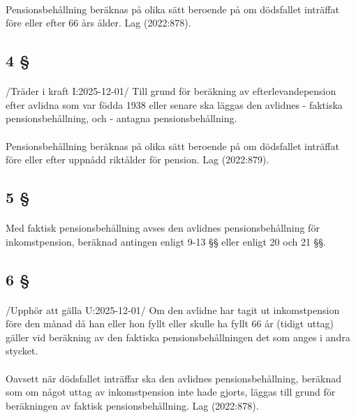 \documentclass[a4paper,notitlepage,openany,10pt]{book}
\begin{document}
\paragraph*{}
Pensionsbehållning beräknas på olika sätt beroende på om dödsfallet inträffat före eller efter 66 års ålder.
Lag (2022:878).
\subsection*{4 §}
\paragraph*{}
/Träder i kraft I:2025-12-01/
Till grund för beräkning av efterlevandepension efter avlidna som var födda 1938 eller senare ska läggas den avlidnes
\newline - faktiska pensionsbehållning, och
\newline - antagna pensionsbehållning.
\paragraph*{}
Pensionsbehållning beräknas på olika sätt beroende på om dödsfallet inträffat före eller efter uppnådd riktålder för pension.
Lag (2022:879).
\subsection*{5 §}
\paragraph*{}
Med faktisk pensionsbehållning avses den avlidnes pensionsbehållning för inkomstpension, beräknad antingen enligt 9-13 §§ eller enligt 20 och 21 §§.
\subsection*{6 §}
\paragraph*{}
/Upphör att gälla U:2025-12-01/
Om den avlidne har tagit ut inkomstpension före den månad då han eller hon fyllt eller skulle ha fyllt 66 år (tidigt uttag) gäller vid beräkning av den faktiska pensionsbehållningen det som anges i andra stycket.
\paragraph*{}
Oavsett när dödsfallet inträffar ska den avlidnes pensionsbehållning, beräknad som om något uttag av inkomstpension inte hade gjorts, läggas till grund för beräkningen av faktisk pensionsbehållning.
Lag (2022:878).
\end{document}

